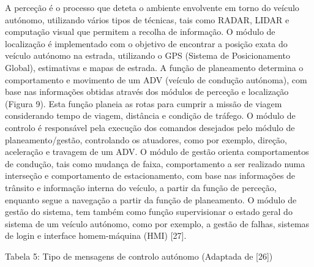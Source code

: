 \documentclass[a4paper,10pt]{texRel}
\begin{document}
A perceção é o processo que deteta o ambiente envolvente em torno do veículo autónomo, utilizando vários tipos de técnicas, tais como RADAR, LIDAR e computação visual que permitem a recolha de informação.  
O módulo de localização é implementado com o objetivo de encontrar a posição exata do veículo autónomo na estrada, utilizando o GPS (Sistema de Posicionamento Global), estimativas e mapas de estrada.
A função de planeamento determina o comportamento e movimento de um ADV (veículo de condução autónoma), com base nas informações obtidas através dos módulos de perceção e localização (Figura 9). Esta função planeia as rotas para cumprir a missão de viagem considerando tempo de viagem, distância e condição de tráfego.
O módulo de controlo é responsável pela execução dos comandos desejados pelo módulo de planeamento/gestão, controlando os atuadores, como por exemplo, direção, aceleração e travagem de um ADV.  
O módulo de gestão orienta comportamentos de condução, tais como mudança de faixa, comportamento a ser realizado numa interseção e comportamento de estacionamento, com base nas informações de trânsito e informação interna do veículo, a partir da função de perceção, enquanto segue a navegação a partir da função de planeamento. O módulo de gestão do sistema, tem também como função supervisionar o estado geral do sistema de um veículo autónomo, como por exemplo, a gestão de falhas, sistemas de login e interface homem-máquina (HMI) [27].

\setlength{\tabcolsep}{0pt}
{\centering
Tabela 5: Tipo de mensagens de controlo autónomo (Adaptada de [26])
\par}
\end{document}
